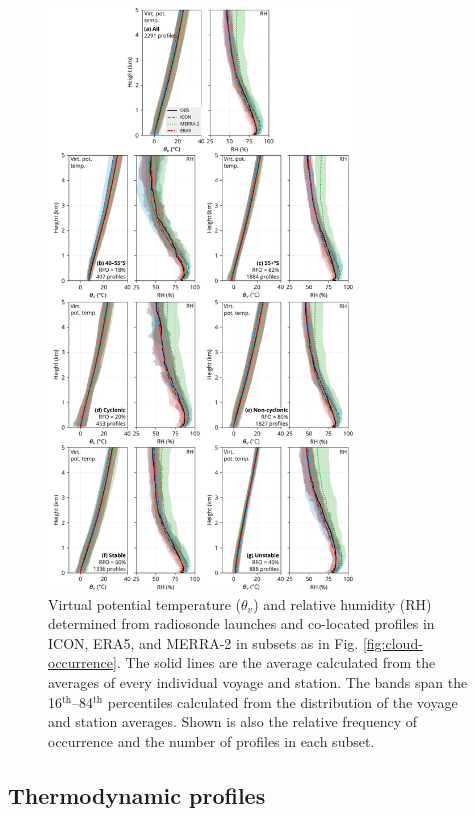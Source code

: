 \documentclass[12pt,a4paper]{article}
\begin{document}
\begin{figure}[p!]
\centering
\includegraphics[width=0.72\textwidth]{img/theta_hur.pdf}
\caption{
Virtual potential temperature ($\theta_v$) and relative humidity (RH)
determined from radiosonde launches and co-located profiles in
ICON, ERA5, and MERRA-2 in subsets as in Fig. \ref{fig:cloud-occurrence}.
The solid lines are the average calculated from the averages of every
individual voyage and station. The bands span the
16$^\mathrm{th}$--84$^\mathrm{th}$ percentiles calculated from the distribution
of the voyage and station averages. Shown is also the relative frequency of
occurrence and the number of profiles in each subset.
}
\label{fig:potential-temperature}
\end{figure}

\subsection{Thermodynamic profiles}
\end{document}
